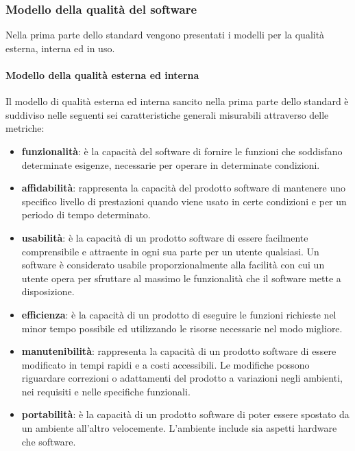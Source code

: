 		\subsubsection{Modello della qualità del software}
		Nella prima parte dello standard vengono presentati i modelli per la qualità esterna, interna ed in uso.
			\paragraph{Modello della qualità esterna ed interna}
			Il modello di qualità esterna ed interna sancito nella prima parte dello standard è suddiviso nelle seguenti sei caratteristiche generali misurabili attraverso delle metriche:
			\begin{itemize}
				\item \textbf{funzionalità}: è la capacità del software di fornire le funzioni che soddisfano determinate esigenze, necessarie per operare in determinate condizioni. 
				\item \textbf{affidabilità}: rappresenta la capacità del prodotto software di mantenere uno specifico livello di prestazioni quando viene usato in certe condizioni e per un periodo di tempo determinato.
				\item \textbf{usabilità}: è la capacità di un prodotto software di essere facilmente comprensibile e attraente in ogni sua parte per un utente qualsiasi. Un software è considerato usabile proporzionalmente alla facilità con cui un utente opera per sfruttare al massimo le funzionalità che il software mette a disposizione.
				\item \textbf{efficienza}: è la capacità di un prodotto di eseguire le funzioni richieste nel minor tempo possibile ed utilizzando le risorse necessarie nel modo migliore.
				\item \textbf{manutenibilità}: rappresenta la capacità di un prodotto software di essere modificato in tempi rapidi e a costi accessibili. Le modifiche possono riguardare correzioni o adattamenti del prodotto a variazioni negli ambienti, nei requisiti e nelle specifiche funzionali.
				\item \textbf{portabilità}: è la capacità di un prodotto software di poter essere spostato da un ambiente all'altro velocemente. L'ambiente include sia aspetti hardware che software.
			\end{itemize}

